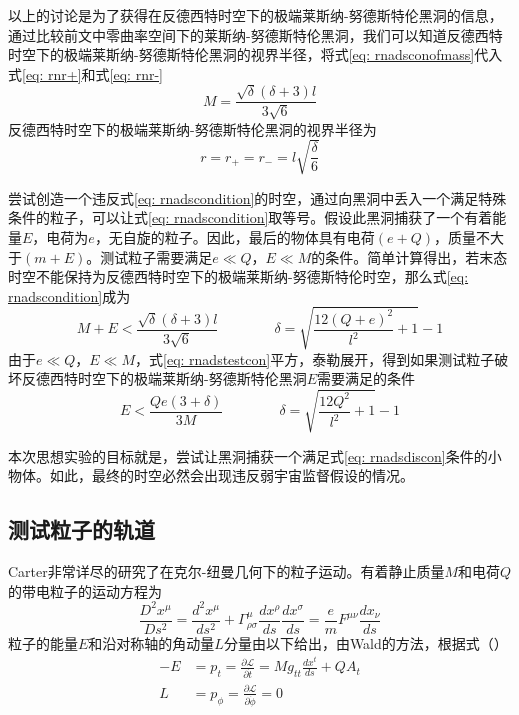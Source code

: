 以上的讨论是为了获得在反德西特时空下的极端莱斯纳-努德斯特伦黑洞的信息，通过比较前文中零曲率空间下的莱斯纳-努德斯特伦黑洞，我们可以知道反德西特时空下的极端莱斯纳-努德斯特伦黑洞的视界半径，将式\eqref{eq: rnadsconofmass}代入式\eqref{eq: rnr+}和式\eqref{eq: rnr-}
\begin{equation}\label{eq: rnadsconofmass}
    M=\frac{\sqrt{\delta } (\delta +3) l}{3 \sqrt{6}}
\end{equation}
反德西特时空下的极端莱斯纳-努德斯特伦黑洞的视界半径为
\begin{equation}\label{eq: rnadshorizonex}
    r=r_+=r_-=l\sqrt{\frac{\delta}{6}} 
\end{equation}

尝试创造一个违反式\eqref{eq: rnadscondition}的时空，通过向黑洞中丢入一个满足特殊条件的粒子，可以让式\eqref{eq: rnadscondition}取等号。假设此黑洞捕获了一个有着能量$E$，电荷为$e$，无自旋的粒子。因此，最后的物体具有电荷$\left(e+Q\right)$，质量不大于$\left(m+E\right)$。测试粒子需要满足$e\ll Q$，$E\ll M$的条件。简单计算得出，若末态时空不能保持为反德西特时空下的极端莱斯纳-努德斯特伦时空，那么式\eqref{eq: rnadscondition}成为
\begin{equation}\label{eq: rnadstestcon}
    M+E < \frac{\sqrt{\delta } (\delta +3) l}{3 \sqrt{6}} \quad\quad\quad\quad  \delta= \sqrt{\frac{12 \left(Q+e\right)^2}{l^2}+1}-1
\end{equation}
由于$e\ll Q$，$E\ll M$，式\eqref{eq: rnadstestcon}平方，泰勒展开，得到如果测试粒子破坏反德西特时空下的极端莱斯纳-努德斯特伦黑洞$E$需要满足的条件
\begin{equation}\label{eq: rnadsdiscon}
    E < \frac{Q e \left(3+\delta\right)}{3M} \qquad\qquad  \delta= \sqrt{\frac{12 Q^2}{l^2}+1}-1
\end{equation}

本次思想实验的目标就是，尝试让黑洞捕获一个满足式\eqref{eq: rnadsdiscon}条件的小物体。如此，最终的时空必然会出现违反弱宇宙监督假设的情况\citep{wald1974gedanken}。
\subsection{测试粒子的轨道}
Carter非常详尽的研究了在克尔-纽曼几何下的粒子运动\cite{carter1968global}。有着静止质量$M$和电荷$Q$的带电粒子的运动方程为
\begin{equation}
    \frac{D^2x^\mu}{D s^2}=\frac{d^2x^\mu}{ds^2}+\Gamma^{\mu}_{\rho\sigma }\frac{dx^\rho}{ds}\frac{dx^\sigma}{ds}=\frac{e}{m}F^{\mu\nu }\frac{dx_\nu}{ds}
\end{equation}
粒子的能量$E$和沿对称轴的角动量$L$分量由以下给出，由Wald的方法\cite{wald1974gedanken}，根据式（）
\begin{align}
    -E&=p_t=\frac{\partial \mathcal{L}}{\partial \dot{t}}=Mg_{tt}\frac{dx^t}{ds}+QA_t \\
    L&=p_\phi=\frac{\partial \mathcal{L}}{\partial \dot{\phi}}=0
\end{align}

